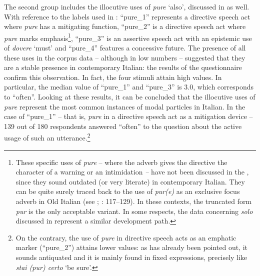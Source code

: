 The second group includes the illocutive uses of \textit{pure} ‘also’, discussed in  as well. With reference to the labels used in : “pure\_1” represents a directive speech act where \textit{pure} has a mitigating function, “pure\_2” is a directive speech act where \textit{pure} marks emphasis\footnote{These specific uses of \textit{pure} – where the adverb gives the directive the character of a warning or an intimidation \textit{–} have not been discussed in the , since they sound outdated (or very literate) in contemporary Italian. They can be quite surely traced back to the use of \textit{pur(e)} as an exclusive focus adverb in Old Italian (see \citealt{Ricca2017}; \citealt{Favaro2021}: 117–129). In these contexts, the truncated form \textit{pur} is the only acceptable variant. In some respects, the data concerning \textit{solo} discussed in  represent a similar development path.}, “pure\_3” is an assertive speech act with an epistemic use of \textit{dovere} ‘must’ and “pure\_4” features a concessive future. The presence of all these uses in the corpus data – although in low numbers – suggested that they are a stable presence in contemporary Italian: the results of the questionnaire confirm this observation. In fact, the four stimuli attain high values. In particular, the median value of “pure\_1” and “pure\_3” is 3.0, which corresponds to “often”. Looking at these results, it can be concluded that the illocutive uses of \textit{pure} represent the most common instances of modal particles in Italian. In the case of “pure\_1” – that is, \textit{pure} in a directive speech act as a mitigation device – 139 out of 180 respondents answered “often” to the question about the active usage of such an utterance.\footnote{On the contrary, the use of \textit{pure} in directive speech acts as an emphatic marker (“pure\_2”) attains lower values: as has already been pointed out, it sounds antiquated and it is mainly found in fixed expressions, precisely like \textit{stai (pur) certo} ‘be sure’.}




